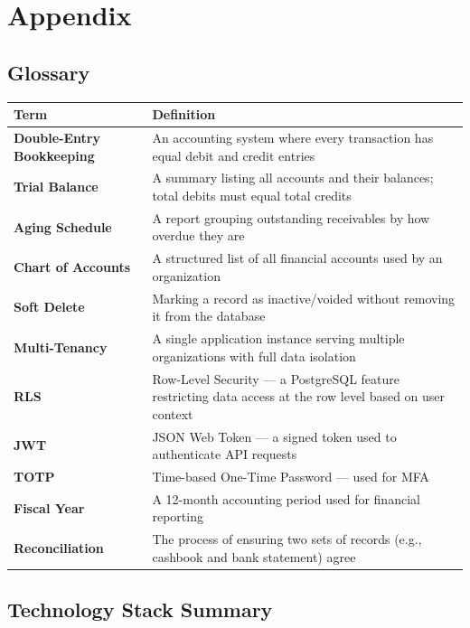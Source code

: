 \documentclass[journal, a4paper, onecolumn, 12pt]{IEEEtran}
\begin{document}
\section{Appendix}

\subsection{Glossary}

\begin{longtable}{|p{}|p{}|}
\hline
Term & Definition \\ \hline
\hline
\textbf{Double-Entry Bookkeeping} & An accounting system where every transaction has equal debit and credit entries \\ \hline
\textbf{Trial Balance} & A summary listing all accounts and their balances; total debits must equal total credits \\ \hline
\textbf{Aging Schedule} & A report grouping outstanding receivables by how overdue they are \\ \hline
\textbf{Chart of Accounts} & A structured list of all financial accounts used by an organization \\ \hline
\textbf{Soft Delete} & Marking a record as inactive/voided without removing it from the database \\ \hline
\textbf{Multi-Tenancy} & A single application instance serving multiple organizations with full data isolation \\ \hline
\textbf{RLS} & Row-Level Security — a PostgreSQL feature restricting data access at the row level based on user context \\ \hline
\textbf{JWT} & JSON Web Token — a signed token used to authenticate API requests \\ \hline
\textbf{TOTP} & Time-based One-Time Password — used for MFA \\ \hline
\textbf{Fiscal Year} & A 12-month accounting period used for financial reporting \\ \hline
\textbf{Reconciliation} & The process of ensuring two sets of records (e.g., cashbook and bank statement) agree \\ \hline
\end{longtable}
\subsection{Technology Stack Summary}
\end{document}
